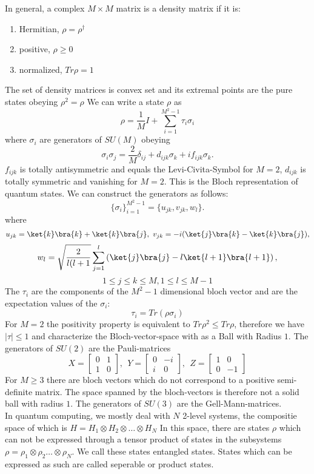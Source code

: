 In general, a complex $M \times M$ matrix is a density matrix if it is:
\begin{center}\begin{enumerate}
	\item Hermitian, $\rho =\rho^{\dagger}$
	\item positive,	$\rho \ge 0$
	\item normalized, $Tr\rho = 1$
\end{enumerate}\end{center}
The set of density matrices is convex set and its extremal points are the pure states obeying $\rho^2 = \rho$
We can write a state $\rho$ as
$$\rho = \frac{1}{M} I + \sum_{i=1}^{M^2-1} \tau_i \sigma_i$$
where $\sigma_i$ are generators of $SU(M)$ obeying
\[
	\sigma_i\sigma_j = \frac{2}{M}\delta_{ij} + d_{ijk}\sigma_k + if_{ijk}\sigma_k
.\]
$f_{ijk}$ is totally antisymmetric and equals the Levi-Civita-Symbol for $M=2$, $d_{ijk}$ is totally symmetric and vanishing for $M=2$.
This is the Bloch representation of quantum states.
We can construct the generators as follows:\cite{kimura03}
 \[
\{\sigma_i\}^{M^2-1}_{i=1} = \{u_{jk},v_{jk},w_l\}
.\]
where
$$
	u_{jk} = \ket{k}\bra{k}+\ket{k}\bra{j}, ~ v_{jk} = -i(\ket{j}\bra{k}-\ket{k}\bra{j}),
$$
$$
	w_l = \sqrt{\frac{2}{l(l+1}} \sum_{j=1}^{l} \left( \ket{j}\bra{j}-l\ket{l+1}\bra{l+1} \right),$$
	$$ 1\le j\le k\le M, 1\le l\le M-1$$
The $\tau_i$ are the components of the $M^2-1$ dimensional bloch vector and are the expectation values of the $\sigma_i$:
$$
	 \tau_i = Tr(\rho\sigma_i)
$$
For $M=2$ the positivity property is equivalent to $Tr\rho^2\le Tr\rho$, therefore we have $|\tau|\le 1$ and characterize the Bloch-vector-space with as a Ball with Radius $1$.
The generators of $SU(2)$ are the Pauli-matrices
$$
 X = \begin{bmatrix} 0 & 1 \\
                    1 & 0
        \end{bmatrix},~
    ~Y = \begin{bmatrix} 0 & -i \\
                    i & 0
         \end{bmatrix},~
    ~Z = \begin{bmatrix} 1 & 0 \\
                    0 & -1
        \end{bmatrix}
$$
For $M\ge3$ there are bloch vectors which do not correspond to a positive semi-definite matrix.
The space spanned by the bloch-vectors is therefore not a solid ball with radius $1$.
The generators of  $SU(3)$ are the Gell-Mann-matrices.  \\
In quantum computing, we mostly deal with $N$ 2-level systems, the compositie space of which is $H = H_1 \otimes H_2 \otimes \ldots \otimes H_N$
In this space, there are states $\rho$ which can not be expressed through a tensor product of states in the subsystems $\rho = \rho_1\otimes\rho_2\ldots\otimes\rho_N$.
We call these states entangled states.
States which can be expressed as such are called seperable or product states.
